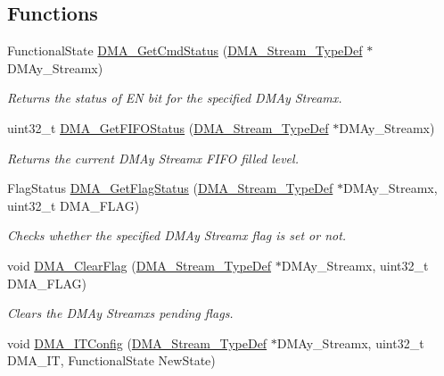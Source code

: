 \subsection*{Functions}
\begin{DoxyCompactItemize}
\item 
Functional\+State \hyperlink{group___d_m_a___group4_gaa4d631cdd6cd020106435f30c0c6fb15}{D\+M\+A\+\_\+\+Get\+Cmd\+Status} (\hyperlink{struct_d_m_a___stream___type_def}{D\+M\+A\+\_\+\+Stream\+\_\+\+Type\+Def} $\ast$D\+M\+Ay\+\_\+\+Streamx)
\begin{DoxyCompactList}\small\item\em Returns the status of EN bit for the specified D\+M\+Ay Streamx. \end{DoxyCompactList}\item 
uint32\+\_\+t \hyperlink{group___d_m_a___group4_ga9893809a7067861ec111f7d712ebf28d}{D\+M\+A\+\_\+\+Get\+F\+I\+F\+O\+Status} (\hyperlink{struct_d_m_a___stream___type_def}{D\+M\+A\+\_\+\+Stream\+\_\+\+Type\+Def} $\ast$D\+M\+Ay\+\_\+\+Streamx)
\begin{DoxyCompactList}\small\item\em Returns the current D\+M\+Ay Streamx F\+I\+FO filled level. \end{DoxyCompactList}\item 
Flag\+Status \hyperlink{group___d_m_a___group4_ga10cfc0fe31d64a1fd8fb3efb4ae2a411}{D\+M\+A\+\_\+\+Get\+Flag\+Status} (\hyperlink{struct_d_m_a___stream___type_def}{D\+M\+A\+\_\+\+Stream\+\_\+\+Type\+Def} $\ast$D\+M\+Ay\+\_\+\+Streamx, uint32\+\_\+t D\+M\+A\+\_\+\+F\+L\+AG)
\begin{DoxyCompactList}\small\item\em Checks whether the specified D\+M\+Ay Streamx flag is set or not. \end{DoxyCompactList}\item 
void \hyperlink{group___d_m_a___group4_ga510d62b4051f5a5de164e84b266b851d}{D\+M\+A\+\_\+\+Clear\+Flag} (\hyperlink{struct_d_m_a___stream___type_def}{D\+M\+A\+\_\+\+Stream\+\_\+\+Type\+Def} $\ast$D\+M\+Ay\+\_\+\+Streamx, uint32\+\_\+t D\+M\+A\+\_\+\+F\+L\+AG)
\begin{DoxyCompactList}\small\item\em Clears the D\+M\+Ay Streamx\textquotesingle{}s pending flags. \end{DoxyCompactList}\item 
void \hyperlink{group___d_m_a___group4_gab9c469a3f5d4aca5c97dee798ffc2f05}{D\+M\+A\+\_\+\+I\+T\+Config} (\hyperlink{struct_d_m_a___stream___type_def}{D\+M\+A\+\_\+\+Stream\+\_\+\+Type\+Def} $\ast$D\+M\+Ay\+\_\+\+Streamx, uint32\+\_\+t D\+M\+A\+\_\+\+IT, Functional\+State New\+State)

\end{DoxyCompactItemize}
